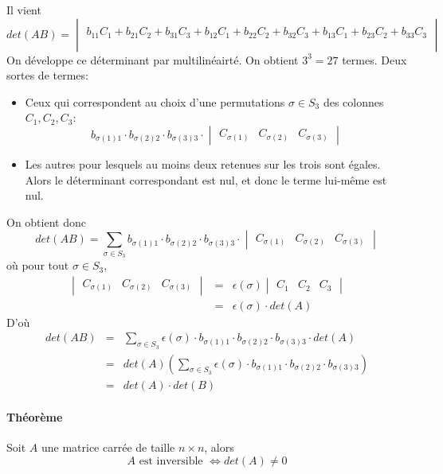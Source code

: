 Il vient
$$det(A B) = \begin{vmatrix} \\ b_{11} C_1 + b_{21} C_2 + b_{31} C_3 + b_{12} C_1 + b_{22} C_2 + b_{32} C_3 + b_{13} C_1 + b_{23} C_2 + b_{33} C_3 \\ \\ \end{vmatrix}$$
On développe ce déterminant par multilinéairté. On obtient $3^3 = 27$ termes. Deux sortes de termes:
\begin{itemize}
  \item Ceux qui correspondent au choix d'une permutations $\sigma \in S_3$ des colonnes $C_1, C_2, C_3$:
    $$b_{\sigma(1) 1} \cdot b_{\sigma(2) 2} \cdot b_{\sigma(3) 3} \cdot \begin{vmatrix} C_{\sigma(1)} & C_{\sigma(2)} & C_{\sigma(3)} \end{vmatrix}$$
    
  \item Les autres pour lesquels au moins deux retenues sur les trois sont égales. Alors le déterminant correspondant est nul, et donc le terme lui-même est nul.
\end{itemize}
On obtient donc
$$det(A B) = \sum_{\sigma \in S_3} b_{\sigma(1) 1} \cdot b_{\sigma(2) 2} \cdot b_{\sigma(3) 3} \cdot \begin{vmatrix} C_{\sigma(1)} & C_{\sigma(2)} & C_{\sigma(3)} \end{vmatrix}$$
où pour tout $\sigma \in S_3$,
\begin{eqnarray*}
  \begin{vmatrix} C_{\sigma(1)} & C_{\sigma(2)} & C_{\sigma(3)} \end{vmatrix}
  &=& \epsilon(\sigma) \begin{vmatrix} C_1 & C_2 & C_ 3 \end{vmatrix} \\
    &=& \epsilon(\sigma) \cdot det(A)
\end{eqnarray*}
D'où
\begin{eqnarray*}
  det(A B) &=& \sum_{\sigma \in S_3} \epsilon(\sigma) \cdot b_{\sigma(1) 1} \cdot b_{\sigma(2) 2} \cdot b_{\sigma(3) 3} \cdot det(A) \\
    &=& det(A) \left( \sum_{\sigma \in S_3} \epsilon(\sigma) \cdot b_{\sigma(1) 1} \cdot b_{\sigma(2) 2} \cdot b_{\sigma(3) 3} \right) \\
    &=& det(A) \cdot det(B)
\end{eqnarray*}

\paragraph{Théorème} Soit $A$ une matrice carrée de taille $n \times n$, alors 
$$A \text{ est inversible } \Leftrightarrow det(A) \neq 0$$

